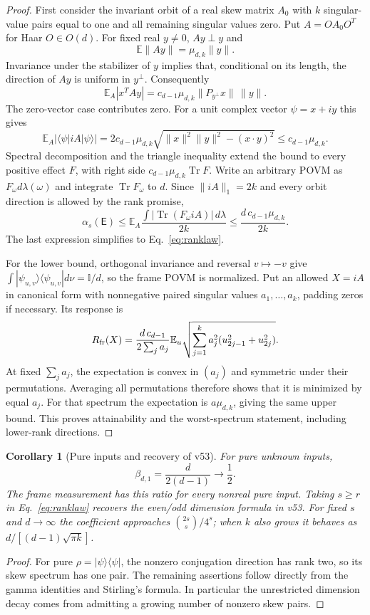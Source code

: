\documentclass[11pt]{article}
\newtheorem{corollary}{Corollary}
\newcommand{\Tr}{\operatorname{Tr}}
\newcommand{\Id}{\mathbb I}
\newcommand{\E}{\mathsf E}
\begin{document}
\begin{proof}
First consider the invariant orbit of a real skew matrix $A_0$ with
$k$ singular-value pairs equal to one and all remaining singular
values zero. Put $A=OA_0O^T$ for Haar $O\in O(d)$.
For fixed real $y\ne0$, $Ay\perp y$ and
\[
\mathbb E\|Ay\|=\mu_{d,k}\|y\|.
\]
Invariance under the stabilizer of $y$ implies that, conditional on
its length, the direction of $Ay$ is uniform in $y^\perp$.
Consequently
\begin{equation}
\mathbb E_A|x^TAy|
=c_{d-1}\mu_{d,k}\|P_{y^\perp}x\|\,\|y\|.
\label{eq:orbitalmean}
\end{equation}
The zero-vector case contributes zero. For a unit complex vector
$\psi=x+iy$ this gives
\[
\mathbb E_A|\langle\psi|iA|\psi\rangle|
=2c_{d-1}\mu_{d,k}
\sqrt{\|x\|^2\|y\|^2-(x\cdot y)^2}
\leq c_{d-1}\mu_{d,k}.
\]
Spectral decomposition and the triangle inequality extend the bound to
every positive effect $F$, with right side
$c_{d-1}\mu_{d,k}\Tr F$. Write an arbitrary POVM as
$F_\omega d\lambda(\omega)$ and integrate $\Tr F_\omega$ to $d$.
Since $\|iA\|_1=2k$ and every orbit direction is allowed by the
rank promise,
\[
\alpha_s(\E)\leq\mathbb E_A
\frac{\int|\Tr(F_\omega iA)|\,d\lambda}{2k}
\leq\frac{d\,c_{d-1}\mu_{d,k}}{2k}.
\]
The last expression simplifies to Eq.~\eqref{eq:ranklaw}.

For the lower bound, orthogonal invariance and reversal $v\mapsto-v$
give $\int|\psi_{u,v}\rangle\langle\psi_{u,v}|d\nu=\Id/d$,
so the frame POVM is normalized. Put an allowed $X=iA$ in canonical
form with nonnegative paired singular values $a_1,\ldots,a_k$,
padding zeros if necessary. Its response is
\[
R_{\rm fr}(X)=\frac{d\,c_{d-1}}{2\sum_j a_j}
\mathbb E_u\sqrt{\sum_{j=1}^k
a_j^2(u_{2j-1}^2+u_{2j}^2)}.
\]
At fixed $\sum_j a_j$, the expectation is convex in $(a_j)$
and symmetric under their permutations. Averaging all permutations
therefore shows that it is minimized by equal $a_j$.
For that spectrum the expectation is $a\mu_{d,k}$, giving the
same upper bound. This proves attainability and the worst-spectrum
statement, including lower-rank directions.
\end{proof}

\begin{corollary}[Pure inputs and recovery of v53]
For pure unknown inputs,
\begin{equation}
\beta_{d,1}=\frac{d}{2(d-1)}\longrightarrow\frac12.
\label{eq:pure}
\end{equation}
The frame measurement has this ratio for every nonreal pure input.
Taking $s\geq r$ in Eq.~\eqref{eq:ranklaw} recovers the even/odd
dimension formula in v53. For fixed $s$ and $d\to\infty$ the
coefficient approaches $\binom{2s}{s}/4^s$; when $k$ also grows it
behaves as $d/[(d-1)\sqrt{\pi k}]$.
\end{corollary}
\begin{proof}
For pure $\rho=|\psi\rangle\langle\psi|$, the nonzero conjugation
direction has rank two, so its skew spectrum has one pair.
The remaining assertions follow directly from the gamma identities
and Stirling's formula. In particular the unrestricted dimension decay
comes from admitting a growing number of nonzero skew pairs.
\end{proof}
\end{document}
